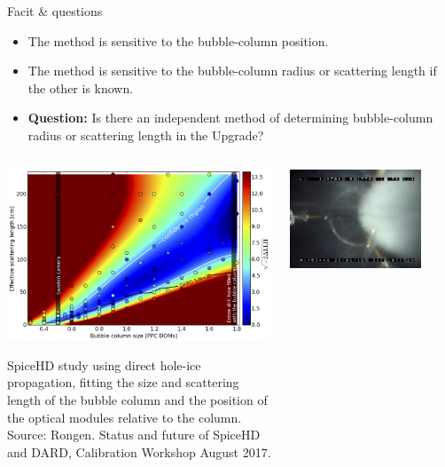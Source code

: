 \begin{frame}[fragile]{Facit \& questions}

  \begin{itemize}
    \item The method is sensitive to the bubble-column position.
    \item The method is sensitive to the bubble-column radius or scattering length if the other is known.
    \item \textbf{Question:} Is there an independent method of determining bubble-column radius or scattering length in the Upgrade?
  \end{itemize}

  \begin{columns}
    \begin{column}{0.5\textwidth}
      \vspace*{3mm}
      \includegraphics[width=\textwidth]{img/flasher-contours-martin}

      \tiny SpiceHD study using direct hole-ice propagation, fitting the size and scattering length of the bubble column and the position of the optical modules relative to the column. Source: Rongen. Status and future of SpiceHD and DARD, Calibration Workshop August 2017.
    \end{column}
    \begin{column}{0.5\textwidth}
      \includegraphics[width=0.8\textwidth]{img/camera2018-01}


\end{column}
\end{columns}
\end{frame}
